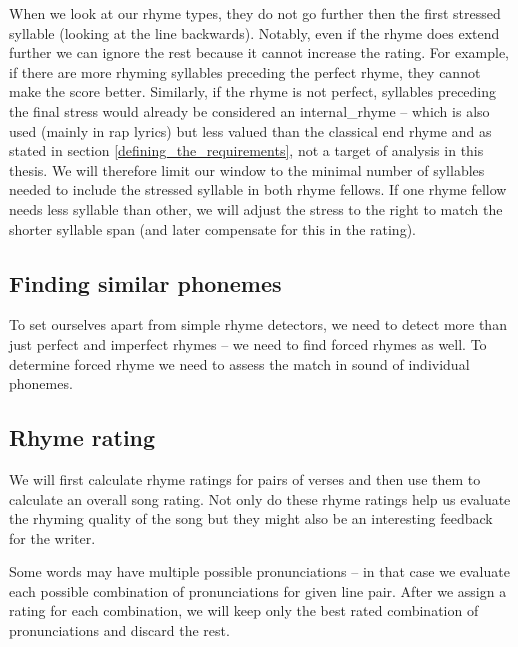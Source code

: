 When we look at our rhyme types, they do not go further then the first stressed syllable (looking at the line backwards). Notably, even if the rhyme does extend further we can ignore the rest because it cannot increase the rating. For example, if there are more rhyming syllables preceding the perfect rhyme, they cannot make the score better. Similarly, if the rhyme is not perfect, syllables preceding the final stress would already be considered an \gls{internal_rhyme} -- which is also used (mainly in rap lyrics) but less valued than the classical end rhyme and as stated in section \ref{defining_the_requirements}, not a target of analysis in this thesis. We will therefore limit our window to the minimal number of syllables needed to include the stressed syllable in both rhyme fellows. If one rhyme fellow needs less syllable than other, we will adjust the stress to the right to match the shorter syllable span (and later compensate for this in the rating).


\subsection{Finding similar phonemes}
To set ourselves apart from simple rhyme detectors, we need to detect more than just perfect and imperfect rhymes -- we need to find forced rhymes as well. To determine forced rhyme we need to assess the match in sound of individual phonemes.

\cite{holtman1996generative}




\subsection{Rhyme rating}
 We will first calculate rhyme ratings for pairs of verses and then use them to calculate an overall song rating. Not only do these rhyme ratings help us evaluate the rhyming quality of the song but they might also be an interesting feedback for the writer. 

 Some words may have multiple possible pronunciations -- in that case we evaluate each possible combination of pronunciations for given line pair. After we assign a rating for each combination, we will keep only the best rated combination of pronunciations and discard the rest. 


